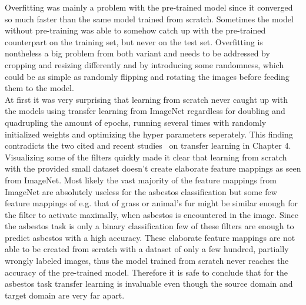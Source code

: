 Overfitting was mainly a problem with the pre-trained model since it converged so much faster than the same model trained from scratch. Sometimes the model without pre-training was able to somehow catch up with the pre-trained counterpart on the training set, but never on the test set. Overfitting is nontheless a big problem from both variant and needs to be addressed by cropping and resizing differently and by introducing some randomness, which could be as simple as randomly flipping and rotating the images before feeding them to the model.\\

At first it was very surprising that learning from scratch never caught up with the models using transfer learning from ImageNet regardless for doubling and quadrupling the amount of epochs, running several times with randomly initialized  weights and optimizing the hyper parameters seperately. This finding contradicts the two cited and recent studies~\cite{he2018rethinking, kornblith2018better} on transfer learning in Chapter 4. Visualizing some of the filters quickly made it clear that learning from scratch with the provided small dataset doesn't create elaborate feature mappings as seen from ImageNet. Most likely the vast majority of the feature mappings from ImageNet  are absolutely useless for the asbestos classification but some few feature mappings of e.g. that of grass or animal's fur might be similar enough for the filter to activate maximally, when asbestos is encountered in the image. Since the asbestos task is only a binary classification few of these filters are enough to predict asbestos with a high accuracy. These elaborate feature mappings are not able to be created from scratch with a dataset of only a few hundred, partially wrongly labeled images, thus the model trained from scratch never reaches the accuracy of the pre-trained model. Therefore it is safe to conclude that for the asbestos task transfer learning is invaluable even though the source domain and target domain are very far apart.
